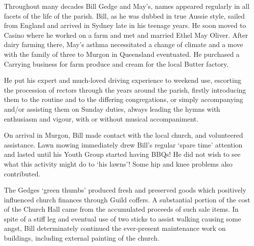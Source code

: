 Throughout many decades Bill Gedge and May's, names appeared regularly in all facets of the life of the parish. Bill, as he was dubbed in true Aussie style, sailed from England and arrived in Sydney late in his teenage years. He soon moved to Casino where he worked on a farm and met and married Ethel May Oliver. After dairy farming there, May's asthma necessitated a change of climate and a move with the family of three to Murgon in Queensland eventuated. He purchased a Carrying business for farm produce and cream for the local Butter factory.



He put his expert and much-loved driving experience to weekend use, escorting the procession of rectors through the years around the parish, firstly introducing them to the routine and to the differing congregations, or simply accompanying and/or assisting them on Sunday duties, always leading the hymns with enthusiasm and vigour, with or without musical accompaniment.



On arrival in Murgon, Bill made contact with the local church, and volunteered assistance. Lawn mowing immediately drew Bill's regular `spare time' attention and lasted until his Youth Group started having BBQs! He did not wish to see what this activity might do to `his lawns'! Some hip and knee problems also contributed.



The Gedges `green thumbs' produced fresh and preserved goods which positively influenced church finances through Guild coffers. A substantial portion of the cost of the Church Hall came from the accumulated proceeds of such sale items. In spite of a stiff leg and eventual use of two sticks to assist walking causing some angst, Bill determinately continued the ever-present maintenance work on buildings, including external painting of the church.









